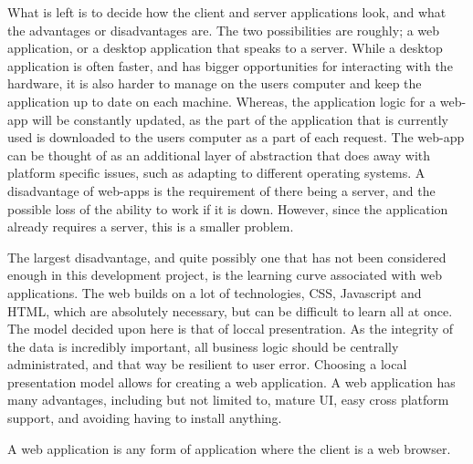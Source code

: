 What is left is to decide how the client and server applications look, and what the advantages or disadvantages are.
The two possibilities are roughly; a web application, or a desktop application that speaks to a server.
While a desktop application is often faster, and has bigger opportunities for interacting with the hardware, it is also harder to manage on the users computer and keep the application up to date on each machine.
Whereas, the application logic for a web-app will be constantly updated, as the part of the application that is currently used is downloaded to the users computer as a part of each request.
The web-app can be thought of as an additional layer of abstraction that does away with platform specific issues, such as adapting to different operating systems.
A disadvantage of web-apps is the requirement of there being a server, and the possible loss of the ability to work if it is down.
However, since the application already requires a server, this is a smaller problem.

The largest disadvantage, and quite possibly one that has not been considered enough in this development project, is the learning curve associated with web applications.
The web builds on a lot of technologies, CSS, Javascript and HTML, which are absolutely necessary, but can be difficult to learn all at once.
The model decided upon here is that of loccal presentration.
As the integrity of the data is incredibly important, all business logic should be centrally administrated, and that way be resilient to user error.
Choosing a local presentation model allows for creating a web application.
A web application has many advantages, including but not limited to, mature UI, easy cross platform support, and avoiding having to install anything.

A web application is any form of application where the client is a web browser.
